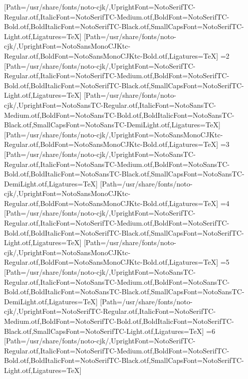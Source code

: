 [Path=/usr/share/fonts/noto-cjk/,UprightFont=NotoSerifTC-Regular.otf,ItalicFont=NotoSerifTC-Medium.otf,BoldFont=NotoSerifTC-Bold.otf,BoldItalicFont=NotoSerifTC-Black.otf,SmallCapsFont=NotoSerifTC-Light.otf,Ligatures=TeX]
[Path=/usr/share/fonts/noto-cjk/,UprightFont=NotoSansMonoCJKtc-Regular.otf,BoldFont=NotoSansMonoCJKtc-Bold.otf,Ligatures=TeX]
\else\ifnum\value{CJKFonts}=2
[Path=/usr/share/fonts/noto-cjk/,UprightFont=NotoSerifTC-Regular.otf,ItalicFont=NotoSerifTC-Medium.otf,BoldFont=NotoSerifTC-Bold.otf,BoldItalicFont=NotoSerifTC-Black.otf,SmallCapsFont=NotoSerifTC-Light.otf,Ligatures=TeX]
[Path=/usr/share/fonts/noto-cjk/,UprightFont=NotoSansTC-Regular.otf,ItalicFont=NotoSansTC-Medium.otf,BoldFont=NotoSansTC-Bold.otf,BoldItalicFont=NotoSansTC-Black.otf,SmallCapsFont=NotoSansTC-DemiLight.otf,Ligatures=TeX]
[Path=/usr/share/fonts/noto-cjk/,UprightFont=NotoSansMonoCJKtc-Regular.otf,BoldFont=NotoSansMonoCJKtc-Bold.otf,Ligatures=TeX]
\else\ifnum\value{CJKFonts}=3
[Path=/usr/share/fonts/noto-cjk/,UprightFont=NotoSansTC-Regular.otf,ItalicFont=NotoSansTC-Medium.otf,BoldFont=NotoSansTC-Bold.otf,BoldItalicFont=NotoSansTC-Black.otf,SmallCapsFont=NotoSansTC-DemiLight.otf,Ligatures=TeX]
[Path=/usr/share/fonts/noto-cjk/,UprightFont=NotoSansMonoCJKtc-Regular.otf,BoldFont=NotoSansMonoCJKtc-Bold.otf,Ligatures=TeX]
\else\ifnum\value{CJKFonts}=4
[Path=/usr/share/fonts/noto-cjk/,UprightFont=NotoSerifTC-Regular.otf,ItalicFont=NotoSerifTC-Medium.otf,BoldFont=NotoSerifTC-Bold.otf,BoldItalicFont=NotoSerifTC-Black.otf,SmallCapsFont=NotoSerifTC-Light.otf,Ligatures=TeX]
[Path=/usr/share/fonts/noto-cjk/,UprightFont=NotoSansMonoCJKtc-Regular.otf,BoldFont=NotoSansMonoCJKtc-Bold.otf,Ligatures=TeX]
\else\ifnum\value{CJKFonts}=5
[Path=/usr/share/fonts/noto-cjk/,UprightFont=NotoSansTC-Regular.otf,ItalicFont=NotoSansTC-Medium.otf,BoldFont=NotoSansTC-Bold.otf,BoldItalicFont=NotoSansTC-Black.otf,SmallCapsFont=NotoSansTC-DemiLight.otf,Ligatures=TeX]
[Path=/usr/share/fonts/noto-cjk/,UprightFont=NotoSerifTC-Regular.otf,ItalicFont=NotoSerifTC-Medium.otf,BoldFont=NotoSerifTC-Bold.otf,BoldItalicFont=NotoSerifTC-Black.otf,SmallCapsFont=NotoSerifTC-Light.otf,Ligatures=TeX]
\else\ifnum\value{CJKFonts}=6
[Path=/usr/share/fonts/noto-cjk/,UprightFont=NotoSerifTC-Regular.otf,ItalicFont=NotoSerifTC-Medium.otf,BoldFont=NotoSerifTC-Bold.otf,BoldItalicFont=NotoSerifTC-Black.otf,SmallCapsFont=NotoSerifTC-Light.otf,Ligatures=TeX]
